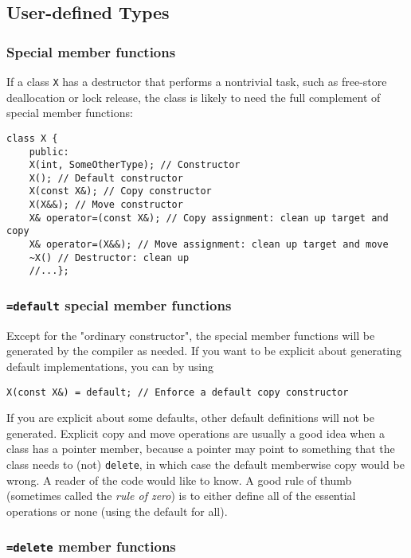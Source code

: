 \documentclass[8pt, table, xcdraw]{article}%
\begin{document}
\subsection{User-defined Types}

\subsubsection{Special member functions}

If a class \lstinline{X} has a destructor that performs a nontrivial task, such as free-store deallocation or lock release, the class is likely to need the full complement of special member functions:

\begin{lstlisting}
class X {
    public:
    X(int, SomeOtherType); // Constructor
    X(); // Default constructor
    X(const X&); // Copy constructor
    X(X&&); // Move constructor
    X& operator=(const X&); // Copy assignment: clean up target and copy
    X& operator=(X&&); // Move assignment: clean up target and move 
    ~X() // Destructor: clean up
    //...};
\end{lstlisting}

\subsubsection{\lstinline{=default} special member functions}

Except for the "ordinary constructor", the special member functions will be generated by the compiler as needed. If you want to be explicit about generating default implementations, you can by using 
\begin{lstlisting}
X(const X&) = default; // Enforce a default copy constructor
\end{lstlisting}

If you are explicit about some defaults, other default definitions will not be generated. Explicit copy and move operations are usually a good idea when a class has a pointer member, because a pointer may point to something that the class needs to (not) \lstinline{delete}, in which case the default memberwise copy would be wrong. A reader of the code would like to know. A good rule of thumb (sometimes called the \textit{rule of zero}) is to either define all of the essential operations or none (using the default for all). 

\subsubsection{\lstinline{=delete} member functions} \label{isdelete}
\end{document}
